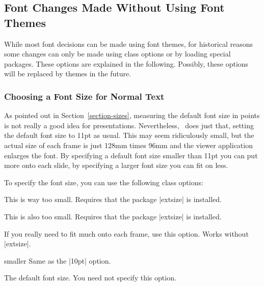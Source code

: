 \subsection{Font Changes Made Without Using Font Themes} 

While most font decisions can be made using font themes, for
historical reasons some changes can only be made using class
options or by loading special packages. These options are explained in
the following. Possibly, these options will be replaced by themes in
the future.


\subsubsection{Choosing a Font Size for Normal Text}

As pointed out in Section~\ref{section-sizes}, measuring the default
font size in points is not really a good idea for
presentations. Nevertheless, \beamer\ does just that, setting the
default font size to 11pt as usual. This may seem ridiculously small, but 
the actual size of each frame is just 128mm times 96mm and the viewer
application enlarges the font. By specifying a default font size
smaller than 11pt you can put more onto each slide, by specifying a
larger font size you can fit on less.

To specify the font size, you can use the following class options:

\begin{classoption}{8pt}
  This is way too small. Requires that the package |extsize|
  is installed.
\end{classoption}

\begin{classoption}{9pt}
  This is also too small. Requires that the package |extsize|
  is installed.
\end{classoption}

\begin{classoption}{10pt}
  If you really need to fit much onto each frame, use this
  option. Works without |extsize|.
\end{classoption}

\begin{classoption}{smaller}
  Same as the |10pt| option.
\end{classoption}

\begin{classoption}{11pt}
  The default font size. You need not specify this option.
\end{classoption}

